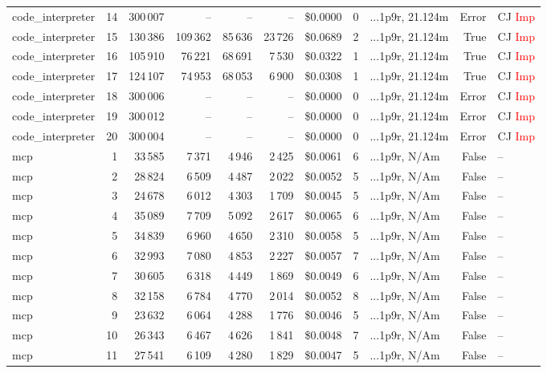 \documentclass[a4paper,11pt]{article}
\begin{document}
\begin{table}[H]
{\begin{tabular}{l r r r r r r r l r l}
code\_interpreter & 14 & 300\,007 & -- & -- & -- & \$0.0000 & 0 & ...1p9r, 21.124m & Error & CJ \textcolor{red}{Imp} \\
code\_interpreter & 15 & 130\,386 & 109\,362 & 85\,636 & 23\,726 & \$0.0689 & 2 & ...1p9r, 21.124m & True & CJ \textcolor{red}{Imp} \\
code\_interpreter & 16 & 105\,910 & 76\,221 & 68\,691 & 7\,530 & \$0.0322 & 1 & ...1p9r, 21.124m & True & CJ \textcolor{red}{Imp} \\
code\_interpreter & 17 & 124\,107 & 74\,953 & 68\,053 & 6\,900 & \$0.0308 & 1 & ...1p9r, 21.124m & True & CJ \textcolor{red}{Imp} \\
code\_interpreter & 18 & 300\,006 & -- & -- & -- & \$0.0000 & 0 & ...1p9r, 21.124m & Error & CJ \textcolor{red}{Imp} \\
code\_interpreter & 19 & 300\,012 & -- & -- & -- & \$0.0000 & 0 & ...1p9r, 21.124m & Error & CJ \textcolor{red}{Imp} \\
code\_interpreter & 20 & 300\,004 & -- & -- & -- & \$0.0000 & 0 & ...1p9r, 21.124m & Error & CJ \textcolor{red}{Imp} \\
\midrule
mcp & 1 & 33\,585 & 7\,371 & 4\,946 & 2\,425 & \$0.0061 & 6 & ...1p9r, N/Am & False & -- \\
mcp & 2 & 28\,824 & 6\,509 & 4\,487 & 2\,022 & \$0.0052 & 5 & ...1p9r, N/Am & False & -- \\
mcp & 3 & 24\,678 & 6\,012 & 4\,303 & 1\,709 & \$0.0045 & 5 & ...1p9r, N/Am & False & -- \\
mcp & 4 & 35\,089 & 7\,709 & 5\,092 & 2\,617 & \$0.0065 & 6 & ...1p9r, N/Am & False & -- \\
mcp & 5 & 34\,839 & 6\,960 & 4\,650 & 2\,310 & \$0.0058 & 5 & ...1p9r, N/Am & False & -- \\
mcp & 6 & 32\,993 & 7\,080 & 4\,853 & 2\,227 & \$0.0057 & 7 & ...1p9r, N/Am & False & -- \\
mcp & 7 & 30\,605 & 6\,318 & 4\,449 & 1\,869 & \$0.0049 & 6 & ...1p9r, N/Am & False & -- \\
mcp & 8 & 32\,158 & 6\,784 & 4\,770 & 2\,014 & \$0.0052 & 8 & ...1p9r, N/Am & False & -- \\
mcp & 9 & 23\,632 & 6\,064 & 4\,288 & 1\,776 & \$0.0046 & 5 & ...1p9r, N/Am & False & -- \\
mcp & 10 & 26\,343 & 6\,467 & 4\,626 & 1\,841 & \$0.0048 & 7 & ...1p9r, N/Am & False & -- \\
mcp & 11 & 27\,541 & 6\,109 & 4\,280 & 1\,829 & \$0.0047 & 5 & ...1p9r, N/Am & False & -- \\

\end{tabular}}
\end{table}
\end{document}
